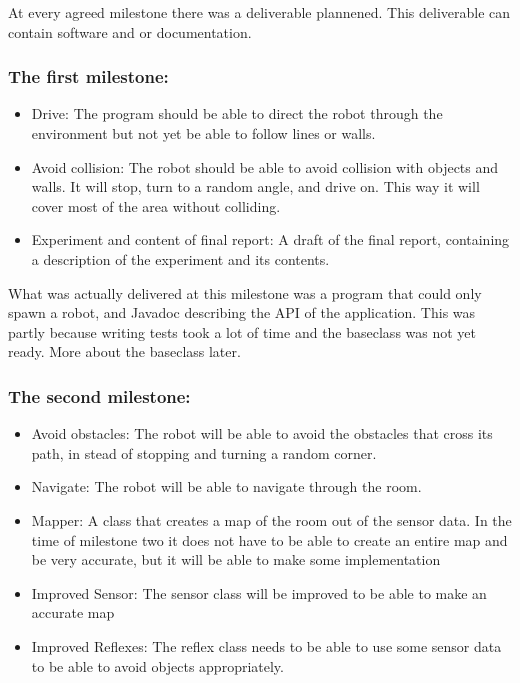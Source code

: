 At every agreed milestone there was a deliverable plannened. This deliverable can contain software and or documentation.

\subsubsection*{The first milestone:}
\begin{itemize}
\item Drive: The program should be able to direct the robot through the environment but not yet be able to follow lines or walls.
\item Avoid collision: The robot should be able to avoid collision with objects and walls. It will stop, turn to a random angle, and drive on. This way it will cover most of the area without colliding.
\item Experiment and content of final report: A draft of the final report, containing a description of the experiment and its contents.
\end{itemize}

What was actually delivered at this milestone was a program that could only spawn a robot, and Javadoc describing the API of the application. This was partly because writing tests took a lot of time and the baseclass was not yet ready. More about the baseclass later.

\subsubsection*{The second milestone:}
\begin{itemize}
\item Avoid obstacles: The robot will be able to avoid the obstacles that cross its path, in stead of stopping and turning a random corner.
\item Navigate: The robot will be able to navigate through the room.
\item Mapper: A class that creates a map of the room out of the sensor data. In the time of milestone two it does not have to be able to create an entire map and be very accurate, but it will be able to make some implementation
\item Improved Sensor: The sensor class will be improved to be able to make an accurate map
\item Improved Reflexes: The reflex class needs to be able to use some sensor data to be able to avoid objects appropriately.
\end{itemize}

